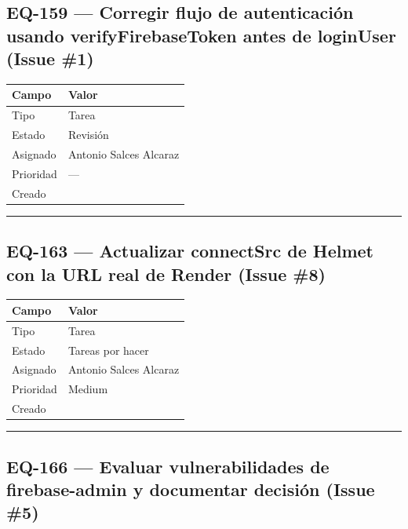 \documentclass[
  spanish,
  11pt,
]{report}
\newcounter{none} %
\begin{document}
\subsection{EQ-159 --- Corregir flujo de autenticación usando
verifyFirebaseToken antes de loginUser (Issue
\#1)}\label{eq-159-corregir-flujo-de-autenticaciuxf3n-usando-verifyfirebasetoken-antes-de-loginuser-issue-1}

{\def\LTcaptype{none} %
\begin{longtable}[]{@{}ll@{}}
\toprule\noalign{}
Campo & Valor \\
\midrule\noalign{}
\endhead
\bottomrule\noalign{}
\endlastfoot
Tipo & Tarea \\
Estado & Revisión \\
Asignado & Antonio Salces Alcaraz \\
Prioridad & --- \\
Creado & \\
\end{longtable}
}

\begin{center}\rule{0.5\linewidth}{0.5pt}\end{center}

\subsection{EQ-163 --- Actualizar connectSrc de Helmet con la URL real
de Render (Issue
\#8)}\label{eq-163-actualizar-connectsrc-de-helmet-con-la-url-real-de-render-issue-8}

{\def\LTcaptype{none} %
\begin{longtable}[]{@{}ll@{}}
\toprule\noalign{}
Campo & Valor \\
\midrule\noalign{}
\endhead
\bottomrule\noalign{}
\endlastfoot
Tipo & Tarea \\
Estado & Tareas por hacer \\
Asignado & Antonio Salces Alcaraz \\
Prioridad & Medium \\
Creado & \\
\end{longtable}
}

\begin{center}\rule{0.5\linewidth}{0.5pt}\end{center}

\subsection{EQ-166 --- Evaluar vulnerabilidades de firebase-admin y
documentar decisión (Issue
\#5)}\label{eq-166-evaluar-vulnerabilidades-de-firebase-admin-y-documentar-decisiuxf3n-issue-5}
\end{document}
